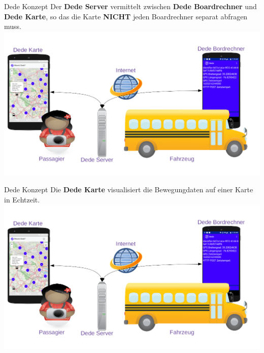 \begin{frame}{Dede Konzept}
  Der \textbf{Dede Server} vermittelt zwischen \textbf{Dede Boardrechner} und \textbf{Dede Karte}, so das die Karte \textbf{NICHT} jeden Boardrechner separat abfragen muss.
  \includegraphics[width=\paperwidth]{dede/dede-concept}
\end{frame}

\begin{frame}{Dede Konzept}
  Die \textbf{Dede Karte} visualisiert die Bewegungdaten auf einer Karte in Echtzeit.
  \includegraphics[width=\paperwidth]{dede/dede-concept}
\end{frame}
